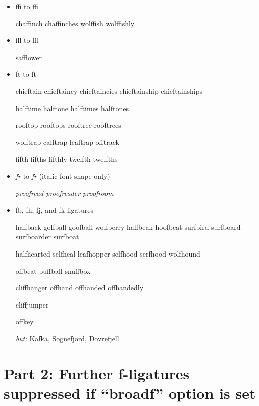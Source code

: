 \begin{itemize}
\item ffi to f\hspace{0pt}fi

chaffinch chaffinches wolffish wolffishly

\item ffl to f\hspace{0pt}fl

safflower



\item ft to f\hspace{0pt}t

chieftain chieftaincy chieftaincies chieftainship chieftainships

halftime halftone halftimes halftones

rooftop rooftops rooftree rooftrees

wolftrap calftrap leaftrap offtrack

fifth fifths fifthly twelfth twelfths



\item \emph{fr} to \emph{f\hspace{0pt}r} (italic font shape only)

\emph{proofread proofreader proofroom}


\item \bgroup \ebg fb, fh, fj, and fk ligatures \egroup

halfback golfball goofball wolfberry halfbeak hoofbeat surfbird surfboard surfboarder surfboat

halfhearted selfheal leafhopper selfhood serfhood wolfhound

offbeat puffball snuffbox

cliffhanger offhand offhanded offhandedly

cliffjumper

offkey

\emph{but:} {\ebg Kafka, Sognefjord, Dovrefjell}




\end{itemize}

\section*{Part 2: Further f-ligatures suppressed if ``broadf'' option is set}

